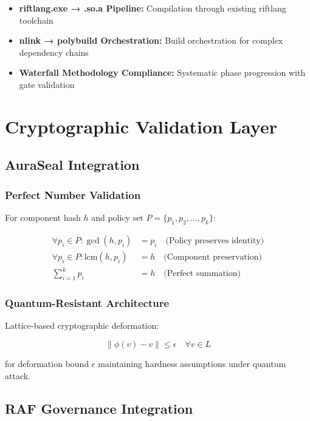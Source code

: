 \documentclass[12pt]{article}
\begin{document}
\begin{itemize}
    \item \textbf{riftlang.exe → .so.a Pipeline:} Compilation through existing riftlang toolchain
    \item \textbf{nlink → polybuild Orchestration:} Build orchestration for complex dependency chains
    \item \textbf{Waterfall Methodology Compliance:} Systematic phase progression with gate validation
\end{itemize}

\section{Cryptographic Validation Layer}

\subsection{AuraSeal Integration}

\subsubsection{Perfect Number Validation}

For component hash $h$ and policy set $P = \{p_1, p_2, \ldots, p_k\}$:

\begin{align}
\forall p_i \in P : \gcd(h, p_i) &= p_i \quad \text{(Policy preserves identity)} \\
\forall p_i \in P : \text{lcm}(h, p_i) &= h \quad \text{(Component preservation)} \\
\sum_{i=1}^{k} p_i &= h \quad \text{(Perfect summation)}
\end{align}

\subsubsection{Quantum-Resistant Architecture}

Lattice-based cryptographic deformation:

\begin{equation}
\|\phi(v) - v\| \leq \epsilon \quad \forall v \in L
\end{equation}

for deformation bound $\epsilon$ maintaining hardness assumptions under quantum attack.

\subsection{RAF Governance Integration}
\end{document}
